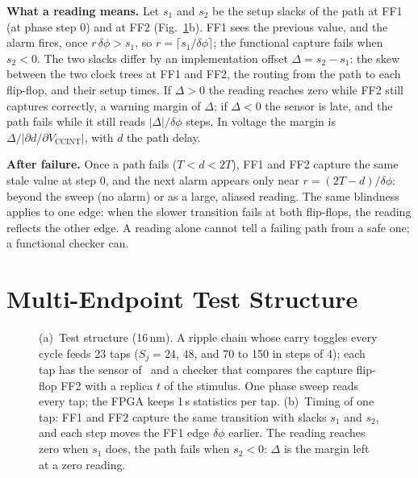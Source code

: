 \documentclass[conference]{IEEEtran}
\newcommand{\Vcc}{V_\mathrm{CCINT}}
\begin{document}
\textbf{What a reading means.} Let $s_1$ and $s_2$ be the setup slacks of the path at FF1 (at phase
step 0) and at FF2 (Fig.~\ref{fig:struct}b). FF1 sees the previous value, and the alarm fires, once
$r\,\delta\phi > s_1$, so $r=\lceil s_1/\delta\phi\rceil$; the functional capture fails when $s_2<0$.
The two slacks differ by an implementation offset $\Delta=s_2-s_1$: the skew between the two clock
trees at FF1 and FF2, the routing from the path to each flip-flop, and their setup times. If
$\Delta>0$ the reading reaches zero while FF2 still captures correctly, a warning margin of $\Delta$;
if $\Delta<0$ the sensor is late, and the path fails while it still reads $|\Delta|/\delta\phi$
steps. In voltage the margin is $\Delta/|\partial d/\partial\Vcc|$, with $d$ the path delay.

\textbf{After failure.} Once a path fails ($T<d<2T$), FF1 and FF2 capture the same stale value at
step 0, and the next alarm appears only near $r=(2T-d)/\delta\phi$: beyond the sweep (no alarm) or as
a large, aliased reading. The same blindness applies to one edge: when the slower transition fails
at both flip-flops, the reading reflects the other edge. A reading alone cannot tell a failing path
from a safe one; a functional checker can.

\section{Multi-Endpoint Test Structure}\label{sec:struct}

\begin{figure}[t]
\centering
\resizebox{\columnwidth}{!}{}
\caption{(a)~Test structure (16\,nm). A ripple chain whose carry toggles every cycle feeds 23 taps
($S_j=24$, 48, and 70 to 150 in steps of 4); each tap has the sensor of~\cite{sbcci25} and a checker
that compares the capture flip-flop FF2 with a replica $t$ of the stimulus. One phase sweep reads
every tap; the FPGA keeps 1\,s statistics per tap. (b)~Timing of one tap: FF1 and FF2 capture the
same transition with slacks $s_1$ and $s_2$, and each step moves the FF1 edge $\delta\phi$ earlier.
The reading reaches zero when $s_1$ does, the path fails when $s_2<0$: $\Delta$ is the margin left
at a zero reading.}
\label{fig:struct}
\end{figure}
\end{document}
